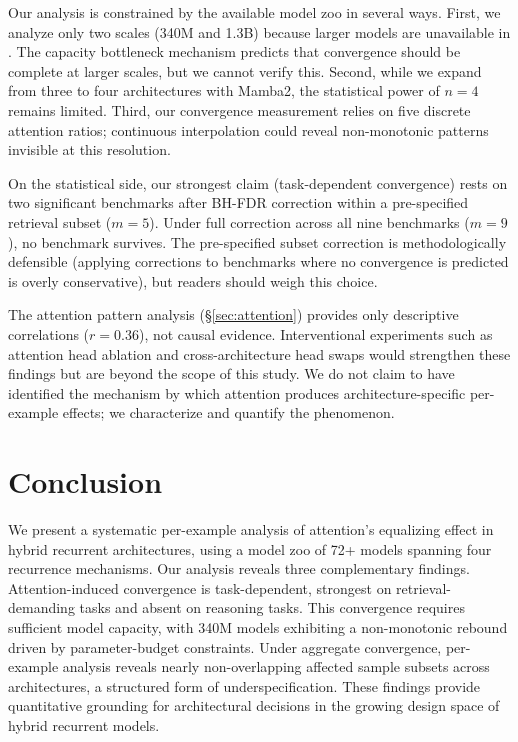 \documentclass[11pt]{article}
\begin{document}
Our analysis is constrained by the available model zoo in several ways.
First, we analyze only two scales (340M and 1.3B) because larger models are unavailable in \citet{wang2025zoo}.
The capacity bottleneck mechanism predicts that convergence should be complete at larger scales, but we cannot verify this.
Second, while we expand from three to four architectures with Mamba2, the statistical power of $n = 4$ remains limited.
Third, our convergence measurement relies on five discrete attention ratios; continuous interpolation could reveal non-monotonic patterns invisible at this resolution.

On the statistical side, our strongest claim (task-dependent convergence) rests on two significant benchmarks after BH-FDR correction within a pre-specified retrieval subset ($m = 5$).
Under full correction across all nine benchmarks ($m = 9$), no benchmark survives.
The pre-specified subset correction is methodologically defensible (applying corrections to benchmarks where no convergence is predicted is overly conservative), but readers should weigh this choice.

The attention pattern analysis (\S\ref{sec:attention}) provides only descriptive correlations ($r = 0.36$), not causal evidence.
Interventional experiments such as attention head ablation and cross-architecture head swaps would strengthen these findings but are beyond the scope of this study.
We do not claim to have identified the mechanism by which attention produces architecture-specific per-example effects; we characterize and quantify the phenomenon.

\section{Conclusion}

We present a systematic per-example analysis of attention's equalizing effect in hybrid recurrent architectures, using a model zoo of 72+ models spanning four recurrence mechanisms.
Our analysis reveals three complementary findings.
Attention-induced convergence is task-dependent, strongest on retrieval-demanding tasks and absent on reasoning tasks.
This convergence requires sufficient model capacity, with 340M models exhibiting a non-monotonic rebound driven by parameter-budget constraints.
Under aggregate convergence, per-example analysis reveals nearly non-overlapping affected sample subsets across architectures, a structured form of underspecification.
These findings provide quantitative grounding for architectural decisions in the growing design space of hybrid recurrent models.
\end{document}

